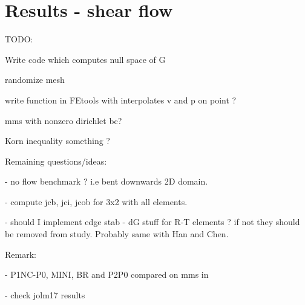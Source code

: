 \newpage
\section*{Results - shear flow}

\newpage
TODO:

Write code which computes null space of G 

randomize mesh

write function in FEtools with interpolates v and p on point ?

mms with nonzero dirichlet bc?

Korn inequality something ?



Remaining questions/ideas:

- no flow benchmark ? i.e bent downwards 2D domain. 

- compute jcb, jci, jcob for 3x2 with all elements.

- should I implement edge stab - dG stuff for R-T elements ? if not they should be  
removed from study. Probably same with Han and Chen.

Remark:

- P1NC-P0, MINI, BR and P2P0 compared on mms in \cite{cakp15}

- check jolm17 results

